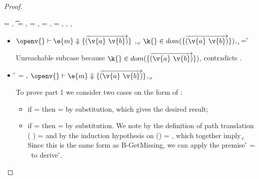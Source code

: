 \begin{lemma}
\begin{proof}
\begin{case}[T-GetHMapAbsent]
  \e{} = { {}},
  \t{} = \Nil,
  \thenprop{\prop{}} = {\topprop{}},
  \elseprop{\prop{}} = {\topprop{}},
  \object{} = {\replacefor
               { {\x{}}}
                          {}
                          {\x{}}},
  \judgementtwo {\propenv{}} { {}},
  \judgement {\propenv{}} { {\HMapgeneric {\mandatory{}} {\absent}}}
           { {}}
           {},
  {\inabsent{\k{}}{\absent{}}}


  \begin{itemize}
    \item[]
      \begin{subcase}[B-Get]
        $\opsem {\openv{}}
        {\e{m}} {\curlymap{\overrightarrow{({\v{a}}\ {\v{b}})}}}$
        ,
         \opsem {\openv{}} {} {\k{}},
         $\keyinmap{\k{}}{\curlymap{\overrightarrow{({\v{a}}\ {\v{b}})}}}$,
          {\k{}} = {\v{}}

       Unreachable subcase because 
         $\keyinmap{\k{}}{\curlymap{\overrightarrow{({\v{a}}\ {\v{b}})}}}$,
         contradicts
                {\inabsent{\k{}}{\absent{}}}.
      \end{subcase}
    \item[]
      \begin{subcase}[B-GetMissing]
        \v{} = \nil,
        $\opsem {\openv{}}
        {\e{m}} {\curlymap{\overrightarrow{({\v{a}}\ {\v{b}})}}}$,
       \opsem {\openv{}} {} {\k{}},

         To prove part 1 we consider two cases on the form of : 
         \begin{itemize}
           \item
         if {} = \emptyobject{}
         then \object{} = \emptyobject{} by substitution, which gives the desired result;
           \item
         if  = { {}}
         then \object{} = { {}} by substitution.
         We note by the definition of path translation
         {\openv{}}({ {}}) =
         {}
         and by the induction hypothesis on 
         {{\openv{}}()} = {},
         which together imply 
         \inopenv {\openv{}} {\object{}} { {\k{}}}.
         Since this is the same form as B-GetMissing, we can apply the premise
        \v{} = \nil\ 
         to derive \inopenv {\openv{}} {\object{}} {\v{}}.
         \end{itemize}
         

\end{subcase}
\end{itemize}
\end{case}
\end{proof}
\end{lemma}
